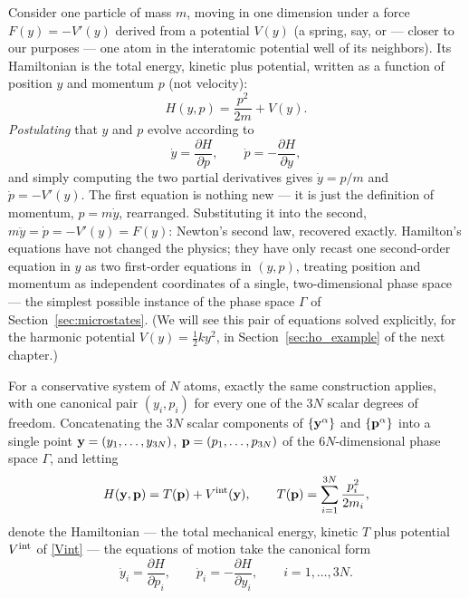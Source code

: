 \begin{example}\label{ex:hamilton1D}
	Consider one particle of mass $m$, moving in one dimension under a force $F(y)=-V'(y)$ derived from a potential $V(y)$ (a spring, say, or --- closer to our purposes --- one atom in the interatomic potential well of its neighbors). Its Hamiltonian is the total energy, kinetic plus potential, written as a function of position $y$ and momentum $p$ (not velocity):
	\begin{equation}
		H(y,p) = \frac{p^2}{2m} + V(y).
	\end{equation}
	\textit{Postulating} that $y$ and $p$ evolve according to
	\begin{equation}
		\dot y = \frac{\partial H}{\partial p}, \qquad \dot p = -\frac{\partial H}{\partial y},
	\end{equation}
	and simply computing the two partial derivatives gives $\dot y = p/m$ and $\dot p = -V'(y)$. The first equation is nothing new --- it is just the definition of momentum, $p=m\dot y$, rearranged. Substituting it into the second, $m\ddot y = \dot p = -V'(y) = F(y)$: Newton's second law, recovered exactly. Hamilton's equations have not changed the physics; they have only recast one second-order equation in $y$ as two first-order equations in $(y,p)$, treating position and momentum as independent coordinates of a single, two-dimensional phase space --- the simplest possible instance of the phase space $\Gamma$ of Section~\ref{sec:microstates}. (We will see this pair of equations solved explicitly, for the harmonic potential $V(y)=\tfrac12ky^2$, in Section~\ref{sec:ho_example} of the next chapter.)
\end{example}

For a conservative system of $N$ atoms, exactly the same construction applies, with one canonical pair $(y_i,p_i)$ for every one of the $3N$ scalar degrees of freedom. Concatenating the $3N$ scalar components of $\{\mathbf{y}^\alpha\}$ and $\{\mathbf{p}^\alpha\}$ into a single point $\mathbf{y}=(y_1,\ldots,y_{3N})$, $\mathbf{p}=(p_1,\ldots,p_{3N})$ of the $6N$-dimensional phase space $\Gamma$, and letting
\begin{equation}
	H(\mathbf{y},\mathbf{p}) = T(\mathbf{p}) + V^{\rm int}(\mathbf{y}), \qquad T(\mathbf{p}) = \sum_{i=1}^{3N}\frac{p_i^2}{2m_i},
\end{equation}
denote the Hamiltonian --- the total mechanical energy, kinetic $T$ plus potential $V^{\rm int}$ of \eqref{Vint} --- the equations of motion take the canonical form
\begin{equation}\label{hameqs}
	\dot y_i = \frac{\partial H}{\partial p_i}, \qquad \dot p_i = -\frac{\partial H}{\partial y_i}, \qquad i=1,\ldots,3N.
\end{equation}

